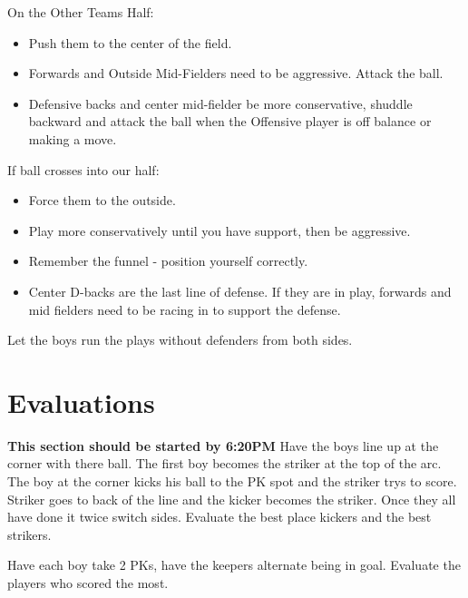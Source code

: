 \documentclass[10pt,letterpaper]{article}
\newenvironment{evenBlock}[1]{%
    \tcolorbox[beamer,%
    noparskip,breakable,
    colback=LightGreen,colframe=DarkGreen,%
    colbacklower=LimeGreen!75!LightGreen,%
    title=#1]}%
    {\endtcolorbox}
\newenvironment{oddBlock}[1]{%
    \tcolorbox[beamer,%
    noparskip,breakable,
    colback=LightBlue,colframe=DarkBlue,%
    colbacklower=DarkBlue!75!LightBlue,%
    title=#1]}%
    {\endtcolorbox}
\begin{document}
\begin{evenBlock}{Defensive Positioning}
    On the Other Teams Half:
    \begin{itemize}
        \item Push them to the center of the field.
        \item Forwards and Outside Mid-Fielders need to be aggressive.  Attack the ball.
        \item Defensive backs and center mid-fielder be more conservative, shuddle backward and attack the ball when the Offensive player is off balance or making a move.
    \end{itemize}
    If ball crosses into our half:
    \begin{itemize}
        \item Force them to the outside.
        \item Play more conservatively until you have support, then be aggressive.
        \item Remember the funnel - position yourself correctly.
        \item Center D-backs are the last line of defense.  If they are in play, forwards and mid fielders need to be racing in to support the defense.
    \end{itemize}
\end{evenBlock}

\begin{oddBlock}{Try It}
    Let the boys run the plays without defenders from both sides.
\end{oddBlock}

\section{Evaluations}
\textbf{This section should be started by 6:20PM}
\begin{evenBlock}{Corner Kicks (10 min)}
Have the boys line up at the corner with there ball.  The first boy becomes the striker at the top of the arc.
The boy at the corner kicks his ball to the PK spot and the striker trys to score.
Striker goes to back of the line and the kicker becomes the striker.
Once they all have done it twice switch sides. 
Evaluate the best place kickers and the best strikers.
\end{evenBlock}

\begin{oddBlock}{PKs (10 min)}
Have each boy take 2 PKs, have the keepers alternate being in goal.  Evaluate the players who scored the most.
\end{oddBlock}
\end{document}
